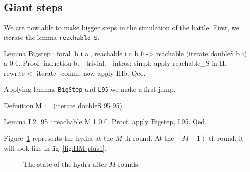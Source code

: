 \subsection{Giant steps}

We are now able to make bigger steps in the simulation of the battle.
First, we iterate the lemma \texttt{reachable\_S}.

\begin{Coqsrc}
Lemma Bigstep : forall b i a , reachable i a b 0 ->
                               reachable (iterate doubleS b i) a 0 0.
 Proof.
  induction b.
  -  trivial.
  -  intros;  simpl;   apply reachable_S in H.
     rewrite <- iterate_comm; now apply IHb.
 Qed.
\end{Coqsrc}

Applying lemmas \texttt{BigStep} and \texttt{L95} we make a first jump.


\begin{Coqsrc}
 Definition M := (iterate doubleS 95 95).

Lemma L2_95 : reachable M 1 0 0.
Proof.
  apply Bigstep,  L95.
Qed.
\end{Coqsrc}

Figure~\ref{fig:HM}  represents the hydra at the $M$-th round.
At the $(M+1)$-th round, it will look like in fig~\ref{fig:HM-plus1}.





\begin{figure}[htb]
\centering
{}
\caption{\label{fig:HM}}
The state of the hydra after $M$ rounds.

\end{figure}


